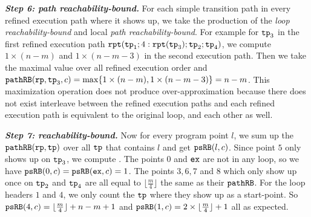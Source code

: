 \textbf{\emph{Step 6: path reachability-bound.}}
For each simple transition path in every refined execution path where it shows up, we take the production of the \emph{loop reachability-bound}
and local \emph{path reachability-bound}.
For example for $\mathtt{tp}_3$ in the first refined execution path 
$\mathtt{rpt}(\mathtt{tp}_1; 4:\mathtt{rpt}(\mathtt{tp}_3); \mathtt{tp}_2; \mathtt{tp}_4)$,
we compute $1 \times (n - m)$ and $1 \times (n - m - 3)$ in the second execution path.
Then we
take the maximal value over all refined execution order and
$\mathtt{pathRB}(\mathtt{rp}, \mathtt{tp}_3, c) = \max\{ 1 \times (n - m), 1 \times (n - m - 3) \} = n - m$.
This maximization operation does not produce over-approximation because there does not exist interleave
between the refined execution paths and each refined execution path is equivalent to the original loop, and each other as well.

\textbf{\emph{Step 7: reachability-bound.}}
Now for every program point $l$, we sum up the $\mathtt{pathRB}(\mathtt{rp}, \mathtt{tp})$ over all $\mathtt{tp}$ that contains $l$ and get $\mathtt{psRB}(l, c)$.
Since point $5$ only shows up on $\mathtt{tp}_3$, we compute .
The points $0$ and $\mathtt{ex}$ are not in any loop, so we have $\mathtt{psRB}(0, c) = \mathtt{psRB}(\mathtt{ex}, c) = 1$.
The points $3, 6, 7$ and $8$ which only show up once on $\mathtt{tp}_2$ and $\mathtt{tp}_4$ are all equal to $\lfloor\frac{m}{4}\rfloor$ the same as their $\mathtt{pathRB}$.
For the loop headers $1$ and $4$, we only count the $\mathtt{tp}$ where they show up as a start-point.
So $\mathtt{psRB}(4, c) = \lfloor\frac{m}{4}\rfloor + n - m + 1$ and $\mathtt{psRB}(1,c) = 2 \times \lfloor\frac{m}{4}\rfloor + 1$ all as expected.